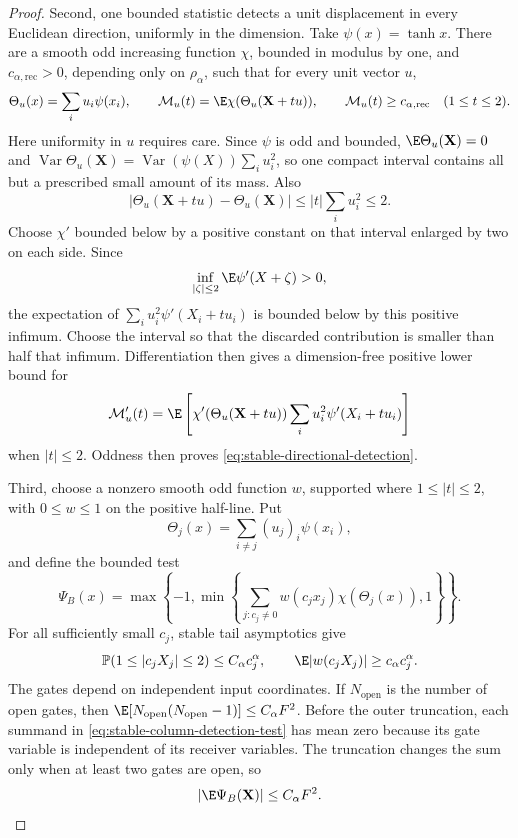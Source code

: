 \begin{proof}
Second, one bounded statistic detects a unit displacement in every
Euclidean direction, uniformly in the dimension.
Take \(\psi(x)=\tanh x\).
There are a smooth odd increasing function \(\chi\), bounded in modulus by
one, and
\(c_{\alpha,\mathrm{rec}}>0\), depending only on \(\rho_\alpha\), such that for every unit
vector \(u\),
\begin{equation}
 \Theta_u(x)=\sum_i u_i\psi(x_i),
 \qquad
 \mathcal M_u(t)=\E\chi(\Theta_u(\mathbf X+tu)),
 \qquad
 \mathcal M_u(t)\ge c_{\alpha,\mathrm{rec}}\quad(1\le t\le2).
 \label{eq:stable-directional-detection}
\end{equation}
Here uniformity in \(u\) requires care.  Since \(\psi\) is odd and bounded,
\(\E\Theta_u(\mathbf X)=0\) and
\(\operatorname{Var}\Theta_u(\mathbf X)
=\operatorname{Var}(\psi(X))\sum_i u_i^2\), so one compact interval contains
all but a prescribed small amount of its mass.  Also
\[
 |\Theta_u(\mathbf X+tu)-\Theta_u(\mathbf X)|
 \le |t|\sum_i u_i^2\le2.
\]
Choose \(\chi'\) bounded below by a positive constant on that interval enlarged
by two on each side.
Since
\[
 \inf_{|\zeta|\le2}\E\psi'(X+\zeta)>0,
\]
the expectation of
\(\sum_i u_i^2\psi'(X_i+tu_i)\) is bounded below by this positive infimum.
Choose the interval so that the discarded contribution is smaller than half
that infimum.  Differentiation then gives a dimension-free positive lower
bound for
\[
 \mathcal M_u'(t)=\E\left[
   \chi'(\Theta_u(\mathbf X+tu))\sum_i u_i^2\psi'(X_i+tu_i)
                 \right]
\]
when \(|t|\le2\).  Oddness then proves
\eqref{eq:stable-directional-detection}.

Third, choose a nonzero smooth odd function \(w\), supported where
\(1\le|t|\le2\), with \(0\le w\le1\) on the positive half-line.
Put
\[
 \Theta_j(x)=\sum_{i\ne j}(u_j)_i\psi(x_i),
\]
and define the bounded test
\begin{equation}
 \Psi_B(x)=\max\left\{-1,\min\left\{
 \sum_{j:c_j\ne0}w(c_jx_j)\chi(\Theta_j(x)),1\right\}\right\}.
 \label{eq:stable-column-detection-test}
\end{equation}
For all sufficiently small \(c_j\), stable tail asymptotics give
\begin{equation}
 \mathbb P(1\le|c_jX_j|\le2)\le C_\alpha c_j^\alpha,
 \qquad
 \E|w(c_jX_j)|\ge c_\alpha c_j^\alpha.
 \label{eq:stable-gate-probability}
\end{equation}
The gates depend on independent input coordinates.
If \(N_{\mathrm{open}}\) is the number of open gates, then
\(\E[N_{\mathrm{open}}(N_{\mathrm{open}}-1)]\le C_\alpha F^2\).
Before the outer truncation, each summand in
\eqref{eq:stable-column-detection-test} has mean zero because its gate variable
is independent of its receiver variables.
The truncation changes the sum only when at least two gates are open, so
\begin{equation}
 |\E\Psi_B(\mathbf X)|\le C_\alpha F^2.
 \label{eq:stable-column-detection-input-mean}
\end{equation}


\end{proof}
